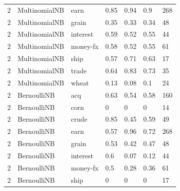 \documentclass{article}
\begin{document}
\begin{table}[h]
\begin{tabular}{lllllll}
2             & MultinomialNB          & earn            & 0.85               & 0.94            & 0.9               & 268              \\
2             & MultinomialNB          & grain           & 0.35               & 0.33            & 0.34              & 48               \\
2             & MultinomialNB          & interest        & 0.59               & 0.52            & 0.55              & 44               \\
2             & MultinomialNB          & money-fx        & 0.58               & 0.52            & 0.55              & 61               \\
2             & MultinomialNB          & ship            & 0.57               & 0.71            & 0.63              & 17               \\
2             & MultinomialNB          & trade           & 0.64               & 0.83            & 0.73              & 35               \\
2             & MultinomialNB          & wheat           & 0.13               & 0.08            & 0.1               & 24               \\
2             & BernoulliNB            & acq             & 0.63               & 0.54            & 0.58              & 160              \\
2             & BernoulliNB            & corn            & 0                  & 0               & 0                 & 14               \\
2             & BernoulliNB            & crude           & 0.85               & 0.45            & 0.59              & 49               \\
2             & BernoulliNB            & earn            & 0.57               & 0.96            & 0.72              & 268              \\
2             & BernoulliNB            & grain           & 0.53               & 0.42            & 0.47              & 48               \\
2             & BernoulliNB            & interest        & 0.6                & 0.07            & 0.12              & 44               \\
2             & BernoulliNB            & money-fx        & 0.5                & 0.28            & 0.36              & 61               \\
2             & BernoulliNB            & ship            & 0                  & 0               & 0                 & 17               \\

\end{tabular}
\end{table}
\end{document}
